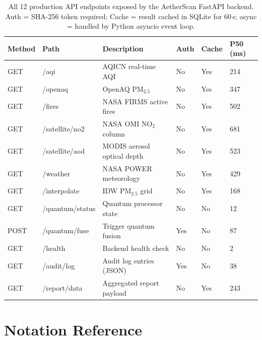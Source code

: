 \documentclass[12pt,a4paper]{article}
\begin{document}
\begin{table}[H]
\centering
\caption[Complete AetherScan API endpoint reference]{%
All 12 production API endpoints exposed by the AetherScan FastAPI
backend. Auth = SHA-256 token required; Cache = result cached in SQLite
for 60\,s; async = handled by Python asyncio event loop.}
\label{tab:fullapi}
\begin{tabularx}{\textwidth}{@{}llXXXX@{}}
\toprule
\textbf{Method} & \textbf{Path} & \textbf{Description}
                & \textbf{Auth} & \textbf{Cache} & \textbf{P50 (ms)} \\
\midrule
GET & /aqi          & AQICN real-time AQI         & No  & Yes & 214 \\
GET & /openaq        & OpenAQ PM$_{2.5}$           & No  & Yes & 347 \\
GET & /fires          & NASA FIRMS active fires    & No  & Yes & 502 \\
GET & /satellite/no2  & NASA OMI NO$_2$ column     & No  & Yes & 681 \\
GET & /satellite/aod  & MODIS aerosol optical depth& No  & Yes & 523 \\
GET & /weather        & NASA POWER meteorology     & No  & Yes & 429 \\
GET & /interpolate    & IDW PM$_{2.5}$ grid        & No  & Yes & 168 \\
GET & /quantum/status & Quantum processor state    & No  & No  & 12  \\
POST& /quantum/fuse   & Trigger quantum fusion     & Yes & No  & 87  \\
GET & /health         & Backend health check       & No  & No  & 2   \\
GET & /audit/log      & Audit log entries (JSON)   & Yes & No  & 38  \\
GET & /report/data    & Aggregated report payload  & No  & Yes & 243 \\
\bottomrule
\end{tabularx}
\end{table}

\clearpage

\clear
\section{Notation Reference}
\label{app:notation}
\end{document}
